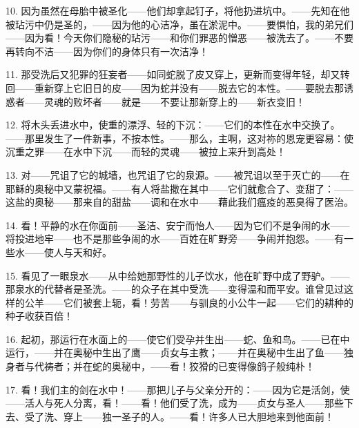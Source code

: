 10. 因为虽然在母胎中被圣化——他们却拿起钉子，将他扔进坑中。——先知在他被玷污中仍是圣的，——因为他的心洁净，虽在淤泥中。——要惧怕，我的弟兄们——因为看！今天你们隐秘的玷污——和你们罪恶的憎恶——被洗去了。——不要再转向不洁——因为你们的身体只有一次洁净！\par

11. 那受洗后又犯罪的狂妄者——如同蛇脱了皮又穿上，更新而变得年轻，却又转回——重新穿上它旧日的皮——因为蛇并没有——脱去它的本性。——要脱去那诱惑者——灵魂的败坏者——就是——不要让那新穿上的——新衣变旧！\par

12. 将木头丢进水中，使重的漂浮、轻的下沉：——它们的本性在水中交换了。——那里发生了一件新事，不按本性。——那么，主啊，这对祢的恩宠更容易：使沉重之罪——在水中下沉——而轻的灵魂——被拉上来升到高处！\par

13. 对——咒诅了它的城墙，也咒诅了它的泉源。——被咒诅以至于灭亡的——在耶稣的奥秘中又蒙祝福。——有人将盐撒在其中——它们就愈合了、变甜了：——这盐的奥秘——那来自的甜盐——调和在水中——藉此我们瘟疫的恶臭得了医治。\par

14. 看！平静的水在你面前——圣洁、安宁而怡人——因为它们不是争闹的水——将投进地牢——也不是那些争闹的水——百姓在旷野旁——争闹并抱怨。——有一些水——使人与天和好。\par

15. 看见了一眼泉水——从中给她那野性的儿子饮水，他在旷野中成了野驴。——那泉水的代替者是圣洗。——的众子在其中受洗——变得温和而平安。谁曾见过这样的公羊——它们被套上轭，看！劳苦——与驯良的小公牛一起——它们的耕种的种子收获百倍！\par

16. 起初，那运行在水面上的——\newline{}使它们受孕并生出——\newline{}蛇、鱼和鸟。——\newline{}已在中运行，——\newline{}并在奥秘中生出了鹰——\newline{}贞女与主教；——\newline{}并在奥秘中生出了鱼——\newline{}独身者与代祷者；并在蛇的奥秘中，——\newline{}看！狡猾的已变得像鸽子般纯朴！\par

17. 看！我们主的剑在水中！——\newline{}那把儿子与父亲分开的：——\newline{}因为它是活剑，使——\newline{}活人与死人分离，看！——\newline{}看！他们受了洗，成为——\newline{}贞女与圣人——\newline{}那些下去、受了洗、穿上——\newline{}独一圣子的人。——\newline{}看！许多人已大胆地来到他面前！\par

